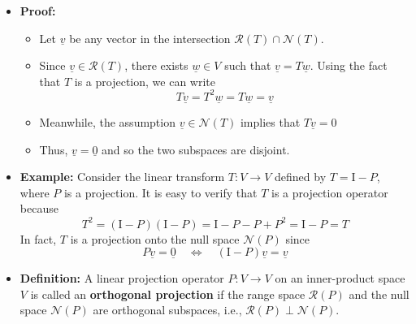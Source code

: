 \documentclass[11pt,twoside]{report}
\newcommand{\vecnot}{\underline}
\newcommand{\Id}{{\mathrm{I}}}
\begin{document}
\begin{itemize}
\item \textbf{Proof:}  
\begin{itemize}
\item Let $\vecnot{v}$ be any vector in the intersection  $ \mathcal{R}(T) \cap  \mathcal{N}(T)$. 
\item Since  $\vecnot{v} \in \mathcal{R}(T)$, there exists $\vecnot{w} \in V$ such that $\vecnot{v} = T\vecnot{w}$. Using the fact that $T$ is a projection, we can write
\[
T\vecnot{v} = T^2  \vecnot{w} = T \vecnot{w} = \vecnot{v}
\]

\item   Meanwhile, the assumption $\vecnot{v}  \in \mathcal{N}(T)$ implies that $T\vecnot{v} = 0$
\item Thus, $\vecnot{v}= \vecnot{0}$ and so the two subspaces are disjoint.  
\end{itemize}

\item \textbf{Example:}  
Consider the linear transform $T \colon V \rightarrow V$ defined by $T = \Id - P$, where $P$ is a projection.
It is easy to verify that $T$ is a projection operator because
\[ T^2 = (\Id-P)(\Id-P) = \Id - P- P + P^2 = \Id-P = T \]
In fact, $T$ is a projection onto the null space $\mathcal{N}(P)$ since 
\[
P \vecnot{v} = \vecnot{0} \quad \iff \quad (\Id-P)\vecnot{v} = \vecnot{v}
\]




\item \textbf{Definition:} A linear  projection operator $P \colon V \rightarrow V$ on an inner-product space $V$ is called an \textbf{orthogonal projection} if  the range space $\mathcal{R}(P) $ and  the null space $\mathcal{N}(P)$ are orthogonal subspaces, i.e.,  $\mathcal{R}(P) \perp \mathcal{N}(P)$. 



\end{itemize}
\end{document}
